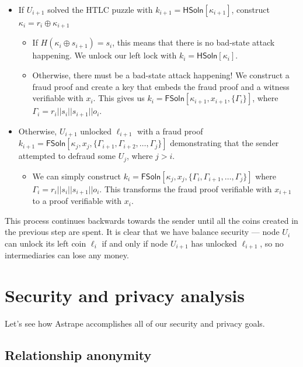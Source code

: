 \documentclass[USenglish,oneside,twocolumn]{article}
\begin{document}
\begin{itemize}
    \item If $U_{i+1}$ solved the HTLC puzzle with $k_{i+1} = \mathsf{HSoln}[\kappa_{i+1}]$, construct $\kappa_i = r_i \oplus \kappa_{i+1}$
          \begin{itemize}
              \item If $H(\kappa_i \oplus s_{i+1}) = s_i$, this means that there is no bad-state attack happening. We unlock our left lock with $k_i = \mathsf{HSoln}[\kappa_i]$.
              \item Otherwise, there must be a bad-state attack happening! We construct a fraud proof and create a key that embeds the fraud proof and a witness verifiable with $x_i$. This gives us $k_i = \mathsf{FSoln}[\kappa_{i+1}, x_{i+1}, \{ \Gamma_i \}]$, where $\Gamma_i = r_i||s_i||s_{i+1}||o_i$.
          \end{itemize}
    \item Otherwise, $U_{i+1}$ unlocked $\ell_{i+1}$ with a fraud proof $k_{i+1} = \mathsf{FSoln}[\kappa_{j}, x_j, \{ \Gamma_{i+1}, \Gamma_{i+2}, \dots, \Gamma_j \}]$ demonstrating that the sender attempted to defraud some $U_j$, where $j>i$.
          \begin{itemize}
              \item We can simply construct $k_i = \mathsf{FSoln}[\kappa_j, x_j, \{ \Gamma_i, \Gamma_{i+1}, \dots, \Gamma_j \}]$ where $\Gamma_i = r_i||s_i||s_{i+1}||o_i$. This transforms the fraud proof verifiable with $x_{i+1}$ to a proof verifiable with $x_i$.
          \end{itemize}
\end{itemize}

This process continues backwards towards the sender until all the coins created in the previous step are spent. It is clear that we have balance security --- node $U_i$ can unlock its left coin $\ell_i$ if and only if node $U_{i+1}$ has unlocked $\ell_{i+1}$, so no intermediaries can lose any money.

\section{Security and privacy analysis} \label{sec:secpriv}

Let's see how Astrape accomplishes all of our security and privacy goals.

\subsection{Relationship anonymity}
\end{document}

